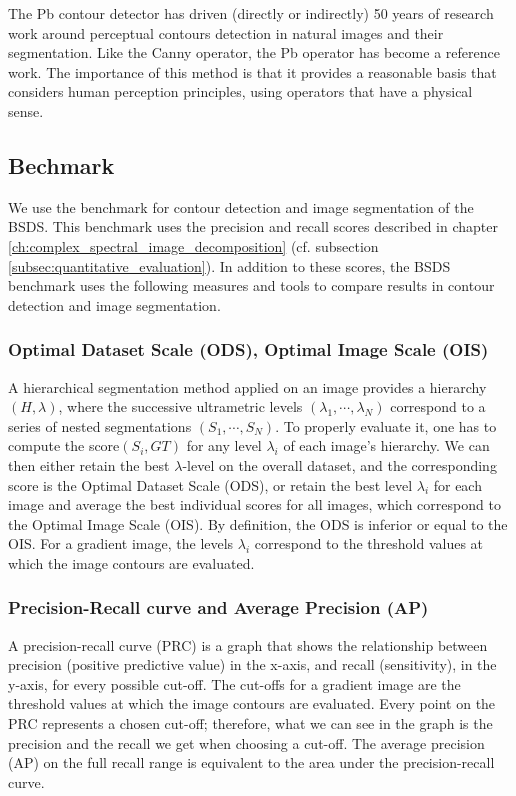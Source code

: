 \documentclass[journal]{IEEEtran}
\begin{document}
The Pb contour detector has driven (directly or indirectly) 50 years of research work around perceptual contours detection in natural images and their segmentation. Like the Canny operator, the Pb operator has become a reference work. The importance of this method is that it provides a reasonable basis that considers human perception principles, using operators that have a physical sense. 

\subsection{Bechmark}
We use the benchmark for contour detection and image segmentation of the BSDS. This benchmark uses the precision and recall scores described in chapter \ref{ch:complex_spectral_image_decomposition} (cf. subsection \ref{subsec:quantitative_evaluation}). In addition to these scores, the BSDS benchmark uses the following measures and tools to compare results in contour detection and image segmentation.


\subsubsection{Optimal Dataset Scale (ODS), Optimal Image Scale (OIS)}

A hierarchical segmentation method applied on an image provides a hierarchy $(H, \lambda)$, where the successive ultrametric levels $(\lambda_1, \cdots , \lambda_N )$ correspond to a series of nested segmentations $(S_1, \cdots , S_N )$. To properly evaluate it, one has to compute the score$(S_i , GT )$ for any level $\lambda_i$ of each image's hierarchy. We can then either retain the best $\lambda$-level on the overall dataset, and the corresponding score is the Optimal Dataset Scale (ODS), or retain the best level $\lambda_i$ for each image and average the best individual scores for all images, which correspond to the Optimal Image Scale (OIS). By definition, the ODS is inferior or equal to the OIS. For a gradient image, the levels $\lambda_i$ correspond to the threshold values at which the image contours are evaluated.

\subsubsection{Precision-Recall curve and Average Precision (AP)}

A precision-recall curve (PRC) is a graph that shows the relationship between precision (positive predictive value) in the x-axis, and recall (sensitivity), in the y-axis, for every possible cut-off. The cut-offs for a gradient image are the threshold values at which the image contours are evaluated. Every point on the PRC represents a chosen cut-off; therefore, what we can see in the graph is the precision and the recall we get when choosing a cut-off. The average precision (AP) on the full recall range is equivalent to the area under the precision-recall curve.
\end{document}
